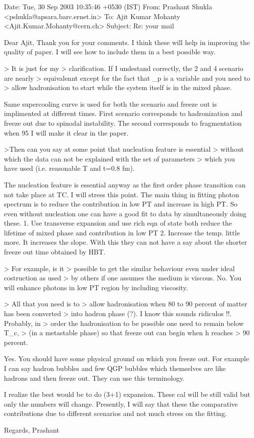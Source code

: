 Date: Tue, 30 Sep 2003 10:35:46 +0530 (IST)
From: Prashant Shukla <pshukla@apsara.barc.ernet.in>
To: Ajit Kumar Mohanty <Ajit.Kumar.Mohanty@cern.ch>
Subject: Re: your mail

Dear Ajit,
  Thank you for your comments. I think these will help in improving the
quality of paper. I will see how to include them in a best possible way.

> It is just for my
> clarification. If I undestand correctly, the 2 and 4 scenario are nearly
> equivalennt except for the fact that \tau_p is a variable and you need to
> allow hadronisation to start while the system itself is in the mixed phase.

   Same supercooling curve is used for both the scenario and freeze out
is implimented at different times. First scenario corresponds to
hadronization and freeze out due to spinodal instability. The second
corresponds to fragmentation when 95%
I will make it clear in the paper.

>Then can you say at some point that nucleation feature is essential
> without which the data can not be explained with the set of parameters
> which you have used (i.e. reasonable T and t=0.8 fm).

  The nucleation feature is essential anyway as the first order phase
transition can not take place at TC. I will stress this point.
The main thing in fitting photon spectrum is to reduce the contribution
in low PT and increase in high PT. So even without nucleation one can
have a good fit to data by simultaneously doing these.
 1. Use transverse expansion and use rich eqn of state both reduce the
 lifetime of mixed phase and contribution in low PT
 2. Increase the temp. little more. It increases the slope.
 With this they can not have a say about the shorter freeze out time
obtained by HBT.

> For example, is it
> possible to get the similar behaviour even under ideal costruction as used
> by others if one assumes the medium is viscous.
  No. You will enhance photons in low PT region by including viscosity.

> All that you need is to
> allow hadronisation when 80 to 90 percent of matter has been converted
> into hadron phase (?). I know this sounds ridiculos !!. Probably, in
> order the hadronisation to be possible one need to remain below T_c,
> (in a metastable phase) so that freeze out can begin when h reaches
> 90 percent.

  Yes. You should have some physical ground on which you freeze out.
For example I can say hadron bubbles and few QGP bubbles which themselves
are like hadrons and then freeze out. They can use this terminology.

  I realize the best would be to do  (3+1) expansion. These cal
will be still valid but only the numbers will change. Presently,
I will say that these the comparative contributions due to different
scenarios and not much stress on the fitting.

 Regards,
Prashant



